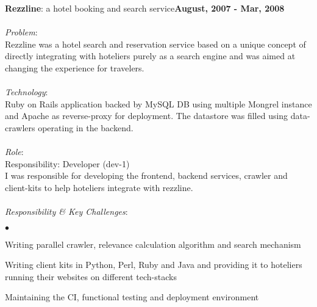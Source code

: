 \documentclass[margin,line]{res}
\newenvironment{list2}{
  \begin{list}{$\bullet$}{%
      \setlength{\itemsep}{0in}
      \setlength{\parsep}{0in} \setlength{\parskip}{0in}
      \setlength{\topsep}{0in} \setlength{\partopsep}{0in} 
      \setlength{\leftmargin}{0.2in}}}{\end{list}}
\begin{document}
\begin{resume}
{\bf Rezzline}: a hotel booking and search service\hfill {\bf August, 2007 - Mar, 2008}\\
\vspace{-.2cm}\\
{\em Problem}:\\
Rezzline was a hotel search and reservation service based on a unique concept of directly integrating with hoteliers purely as a search engine and was aimed at changing the experience for travelers.\\
\\
{\em Technology}:\\
Ruby on Rails application backed by MySQL DB using multiple Mongrel instance and Apache as reverse-proxy for deployment. The datastore was filled using data-crawlers operating in the backend.\\
\\
{\em Role}: \\
Responsibility: Developer (dev-1)\\
I was responsible for developing the frontend, backend services, crawler and client-kits to help hoteliers integrate with rezzline.\\
\\
{\em Responsibility \& Key Challenges}:
\vspace*{.05in}  
\begin{list2}
\item Writing parallel crawler, relevance calculation algorithm and search mechanism
\item Writing client kits in Python, Perl, Ruby and Java and providing it to hoteliers running their websites on different tech-stacks
\item Maintaining the CI, functional testing  and deployment environment
\end{list2}


\end{resume}
\end{document}
